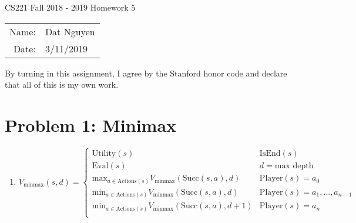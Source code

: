 \documentclass[12pt]{article}
\begin{document}
\begin{center}
{\Large CS221 Fall 2018 - 2019 Homework 5}

\begin{tabular}{rl}     
Name: & Dat Nguyen \\
Date: & 3/11/2019
\end{tabular}
\end{center}
 
 By turning in this assignment, I agree by the Stanford honor code and declare
that all of this is my own work.

\section*{Problem 1: Minimax}
\begin{enumerate}[label=(\alph*)]
	\item
	$V_{\text{minmax}}(s, d)=
	\begin{cases}
	\text{Utility}(s) &\text{IsEnd}(s)\\
	\text{Eval}(s) &d = \text{max depth}\\
	\text{max}_{a \in \text{Actions}(s)} V_{\text{minmax}}(\text{Succ}(s, a), d ) & \text{Player}(s) = a_0\\
	\text{min}_{a \in \text{Actions}(s)} V_{\text{minmax}}(\text{Succ}(s, a), d) & \text{Player}(s) = a_1, \dots, a_{n - 1} \\
	\text{min}_{a \in \text{Actions}(s)} V_{\text{minmax}}(\text{Succ}(s, a), d + 1) & \text{Player}(s) = a_{n} \\
	\end{cases}$
\end{enumerate}
\end{document}
